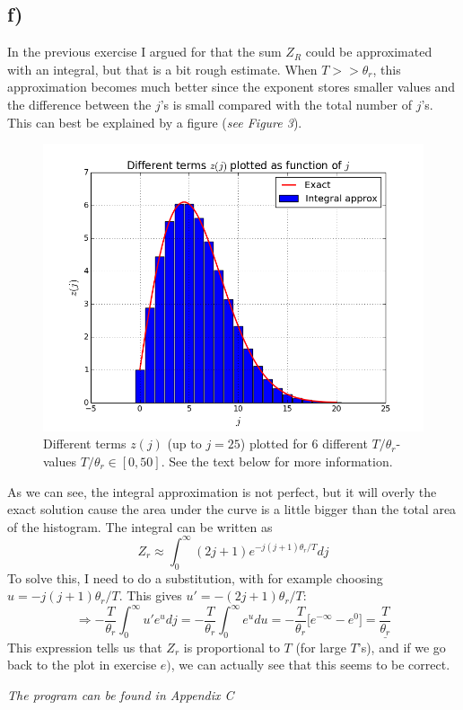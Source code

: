 \documentclass{scrartcl}
\begin{document}
\subsection*{f)}
In the previous exercise I argued for that the sum $Z_R$ could be approximated with an integral, but that is a bit rough estimate. When $T>>\theta_r$, this approximation becomes much better since the exponent stores smaller values and the difference between the $j$'s is small compared with the total number of $j$'s. This can best be explained by a figure (\textit{see Figure 3}).\par\vspace{3mm}
\begin{figure}[!htbp]
\centering
\includegraphics[width=120mm]{oblig2_3.png}
\caption{Different terms $z(j)$ (up to $j=25$) plotted for 6 different $T/\theta_r$-values $T/\theta_r\in [0,50]$. See the text below for more information. \label{overflow}}
\end{figure}
As we can see, the integral approximation is not perfect, but it will overly the exact solution cause the area under the curve is a little bigger than the total area of the histogram. The integral can be written as
\begin{equation}
Z_r\approx \int_0^\infty (2j+1)e^{-j(j+1)\theta_r/T}dj
\end{equation}
To solve this, I need to do a substitution, with for example choosing $u=-j(j+1)\theta_r/T$. This gives $u'=-(2j+1)\theta_r/T$:
$$\Rightarrow -\frac{T}{\theta_r} \int_0^\infty u' e^u dj=-\frac{T}{\theta_r}\int_0^\infty e^udu=-\frac{T}{\theta_r}\bigg[e^{-\infty}-e^0\bigg]=\underline{\frac{T}{\theta_r}}$$
This expression tells us that $Z_r$ is proportional to $T$ (for large $T$'s), and if we go back to the plot in exercise $e)$, we can actually see that this seems to be correct.\par\vspace{3mm}
\textit{The program can be found in Appendix C}
\end{document}
